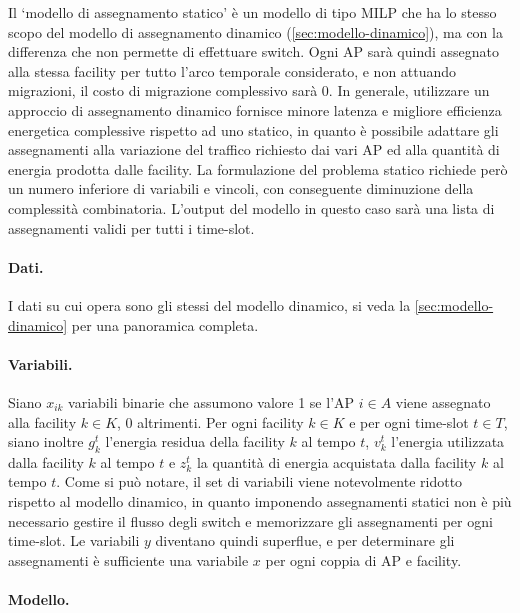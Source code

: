 Il `modello di assegnamento statico' è un modello di tipo MILP che ha lo stesso scopo del modello di assegnamento dinamico (\ref{sec:modello-dinamico}), ma con la differenza che non permette di effettuare switch. Ogni AP sarà quindi assegnato alla stessa facility per tutto l'arco temporale considerato, e non attuando migrazioni, il costo di migrazione complessivo sarà 0. In generale, utilizzare un approccio di assegnamento dinamico fornisce minore latenza e migliore efficienza energetica complessive rispetto ad uno statico, in quanto è possibile adattare gli assegnamenti alla variazione del traffico richiesto dai vari AP ed alla quantità di energia prodotta dalle facility. La formulazione del problema statico richiede però un numero inferiore di variabili e vincoli, con conseguente diminuzione della complessità combinatoria. L'output del modello in questo caso sarà una lista di assegnamenti validi per tutti i time-slot.

\paragraph*{Dati.}

I dati su cui opera sono gli stessi del modello dinamico, si veda la \autoref{sec:modello-dinamico} per una panoramica completa.

\paragraph*{Variabili.}

Siano $x_{ik}$ variabili binarie che assumono valore 1 se l'AP $i \in A$ viene assegnato alla facility $k \in K$, 0 altrimenti. Per ogni facility $k \in K$ e per ogni time-slot $t \in T$, siano inoltre $g^t_k$ l'energia residua della facility $k$ al tempo $t$, $v^t_k$ l'energia utilizzata dalla facility $k$ al tempo $t$ e $z^t_k$ la quantità di energia acquistata dalla facility $k$ al tempo $t$. Come si può notare, il set di variabili viene notevolmente ridotto rispetto al modello dinamico, in quanto imponendo assegnamenti statici non è più necessario gestire il flusso degli switch e memorizzare gli assegnamenti per ogni time-slot. Le variabili $y$ diventano quindi superflue, e per determinare gli assegnamenti è sufficiente una variabile $x$ per ogni coppia di AP e facility.

\paragraph*{Modello.}

